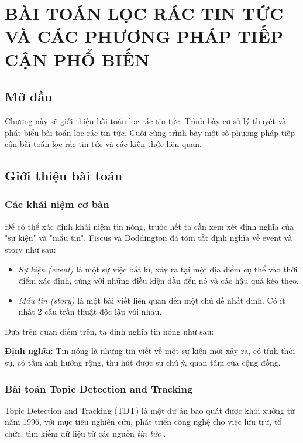 \chapter{BÀI TOÁN LỌC RÁC TIN TỨC VÀ CÁC PHƯƠNG PHÁP TIẾP CẬN PHỔ BIẾN}
\ifpdf
    \graphicspath{{Chapter2/Chapter2Figs/PNG/}{Chapter2/Chapter2Figs/PDF/}{Chapter2/Chapter2Figs/}}
\else
    \graphicspath{{Chapter2/Chapter2Figs/EPS/}{Chapter2/Chapter2Figs/}}
\fi

\section{Mở đầu}
Chương này sẽ giới thiệu bài toán lọc rác tin tức. Trình bày cơ sở lý thuyết và phát biểu bài toán lọc rác tin tức. Cuối cùng trình bày một số phương pháp tiếp cận bài toán lọc rác tin tức  và các kiến thức liên quan.

\section{Giới thiệu bài toán} %
	\subsection{Các khái niệm cơ bản}
	Để có thể xác định khái niệm tin nóng, trước hết ta cần xem xét định nghĩa của "sự kiện" và "mẩu tin". Fiscus và Doddington \cite{Fiscus:TDTDefinition} đã tóm tắt định nghĩa về event và story như sau:
	\begin{itemize}
		\item \textit{Sự kiện (event)} là một sự việc bất kì, xảy ra tại một địa điểm cụ thể vào thời điểm xác định, cùng với những điều kiện dẫn đến nó và các hậu quả kéo theo.
		
		\item \textit{Mẩu tin (story)} là một bài viết liên quan đến một chủ đề nhất định. Có ít nhất 2 câu trần thuật độc lập với nhau.
	\end{itemize}
	
	Dựa trên quan điểm trên, ta định nghĩa tin nóng như sau:
	
	\textbf{Định nghĩa:} Tin nóng là những tin viết về một sự kiện mới xảy ra, có tính thời sự, có tầm ảnh hưởng rộng, thu hút được sự chú ý, quan tâm của cộng đồng.

%
	\subsection{Bài toán Topic Detection and Tracking}
	Topic Detection and Tracking (TDT) là một dự án bao quát được khởi xướng từ năm 1996, với mục tiêu nghiên cứu, phát triển công nghệ cho việc lưu trữ, tổ chức, tìm kiếm dữ liệu từ các nguồn \textit{tin tức} \cite{Fiscus:TDTDefinition}.
	
